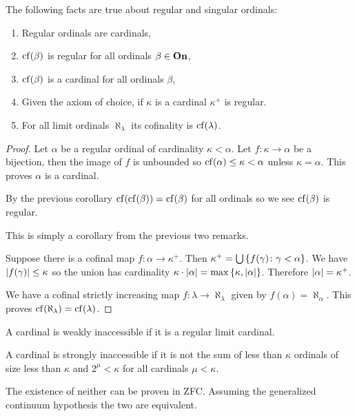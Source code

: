 \begin{proposition}
    The following facts are true about regular and singular ordinals:
    \begin{enumerate}
        \item Regular ordinals are cardinals,
        \item \(\operatorname{cf}(\beta)\) is regular for all ordinals \(\beta\in{\bf On}\),
        \item \(\operatorname{cf}(\beta)\) is a cardinal for all ordinals \(\beta\),
        \item Given the axiom of choice, if \(\kappa\) is a cardinal
              \(\kappa^{+}\) is regular.
        \item For all limit ordinals \(\aleph_{\lambda}\) its cofinality
              is \(\operatorname{cf}(\lambda)\).
    \end{enumerate}

    \begin{proof}
        Let \(\alpha\) be a regular ordinal of cardinality \(\kappa<\alpha\).
        Let \(f:\kappa\to\alpha\) be a bijection, then the image of \(f\) is
        unbounded so \(\operatorname{cf}(\alpha)\leq\kappa<\alpha\) unless \(\kappa=\alpha\).
        This proves \(\alpha\) is a cardinal.

        By the previous corollary \(\operatorname{cf}(\operatorname{cf}(\beta))=\operatorname{cf}(\beta)\) for all
        ordinals so we see \(\operatorname{cf}(\beta)\) is regular.

        This is simply a corollary from the previous two remarks.

        Suppose there is a cofinal map \(f:\alpha\to\kappa^{+}\). Then
        \(\kappa^{+}=\bigcup\left\{f(\gamma)\colon\gamma<\alpha\right\}\). We have
        \(\lvert f(\gamma)\rvert\leq\kappa\) so the union has cardinality
        \(\kappa\cdot\lvert\alpha\rvert=\max\left\{\kappa,\lvert\alpha\rvert\right\}\). Therefore
        \(\lvert\alpha\rvert=\kappa^{+}\).

        We have a cofinal strictly increasing map
        \(f:\lambda\to\aleph_{\lambda}\) given by \(f(\alpha)=\aleph_{\alpha}\).
        This proves \(\operatorname{cf}(\aleph_{\lambda})=\operatorname{cf}(\lambda)\).
    \end{proof}
\end{proposition}

\begin{definition}
    A cardinal is weakly inaccessible if it is a regular limit cardinal.

    A cardinal is strongly inaccessible if it is not the sum of less than
    \(\kappa\) ordinals of size less than \(\kappa\) and \(2^{\mu}<\kappa\) for
    all cardinals \(\mu<\kappa\).

    The existence of neither can be proven in ZFC. Assuming the generalized
    continuum hypothesis the two are equivalent.
\end{definition}

